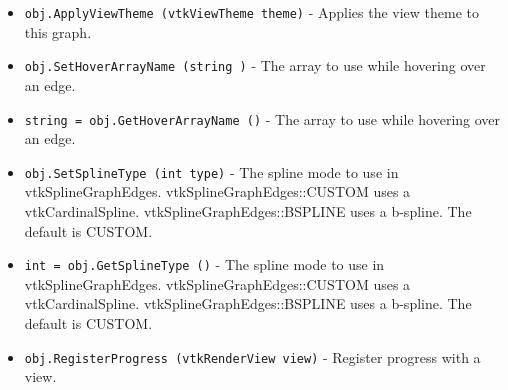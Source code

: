 \begin{itemize}
\item  \verb|obj.ApplyViewTheme (vtkViewTheme theme)| -  Applies the view theme to this graph.

\item  \verb|obj.SetHoverArrayName (string )| -  The array to use while hovering over an edge.

\item  \verb|string = obj.GetHoverArrayName ()| -  The array to use while hovering over an edge.

\item  \verb|obj.SetSplineType (int type)| -  The spline mode to use in vtkSplineGraphEdges.
 vtkSplineGraphEdges::CUSTOM uses a vtkCardinalSpline.
 vtkSplineGraphEdges::BSPLINE uses a b-spline.
 The default is CUSTOM.

\item  \verb|int = obj.GetSplineType ()| -  The spline mode to use in vtkSplineGraphEdges.
 vtkSplineGraphEdges::CUSTOM uses a vtkCardinalSpline.
 vtkSplineGraphEdges::BSPLINE uses a b-spline.
 The default is CUSTOM.

\item  \verb|obj.RegisterProgress (vtkRenderView view)| -  Register progress with a view.

\end{itemize}
